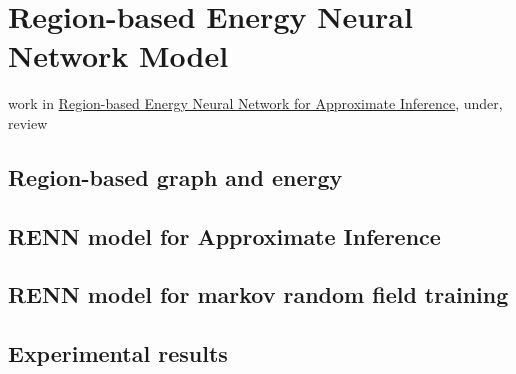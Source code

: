 \chapter{Region-based Energy Neural Network Model}
work in \href{https://github.com/FirstHandScientist/paper_renn}{Region-based Energy Neural Network for Approximate Inference}, under, review
\section{Region-based graph and energy}

\section{RENN model for Approximate Inference}

\section{RENN model for markov random field training}

\section{Experimental results}

